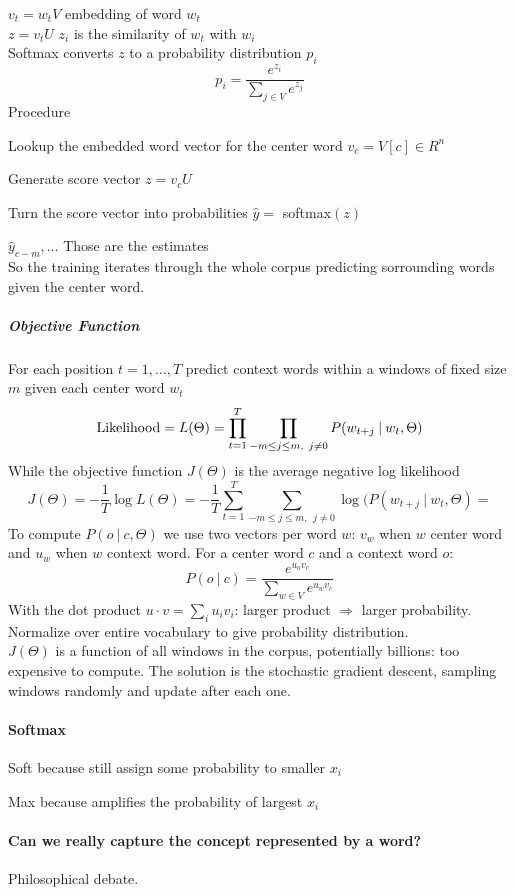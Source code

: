 \documentclass[10pt]{report}
\begin{document}
$v_t = w_tV$ embedding of word $w_t$\\$z=v_tU$ $z_i$ is the similarity of $w_t$ with $w_i$\\Softmax converts $z$ to a probability distribution $p_i$ $$p_i=\frac{e^{z_i}}{\sum_{j\in V}e^{z_j}}$$
Procedure
\begin{list}{}{}
	\item Lookup the embedded word vector for the center word $v_c = V[c] \in R^n$
	\item Generate score vector $z = v_cU$
	\item Turn the score vector into probabilities $\hat{y} =$ softmax$(z)$
\end{list}
$\hat{y}_{c-m},\ldots$ Those are the estimates\\ %
So the training iterates through the whole corpus predicting sorrounding words given the center word.
\subparagraph{Objective Function} For each position $t=1,\ldots,T$ predict context words within a windows of fixed size $m$ given each center word $w_t$ $$\hbox{Likelihood} = L(\Theta) = \prod_{t=1}^T\prod_{-m\leq j\leq m,\:\:j\neq 0} P(w_{t+j}\:|\:w_t,\Theta)$$
While the objective function $J(\Theta)$ is the average negative log likelihood $$J(\Theta) = -\frac{1}{T}\log L(\Theta) = -\frac{1}{T}\sum_{t=1}^T\sum_{-m\leq j\leq m,\:\:j\neq 0} \log(P(w_{t+j}\:|\:w_t,\Theta)=$$
To compute $P(o\:|\:c, \Theta)$ we use two vectors per word $w$: $v_w$ when $w$ center word and $u_w$ when $w$ context word. For a center word $c$ and a context word $o$:$$P(o\:|\:c) = \frac{e^{u_o v_c}}{\sum_{w\in V} e^{u_w v_c}}$$
With the dot product $u\cdot v = \sum_i u_iv_i$: larger product $\Rightarrow$ larger probability. Normalize over entire vocabulary to give probability distribution.\\
$J(\Theta)$ is a function of all windows in the corpus, potentially billions: too expensive to compute. The solution is the stochastic gradient descent, sampling windows randomly and update after each one.
\paragraph{Softmax}\begin{list}{}{}
	\item Soft because still assign some probability to smaller $x_i$
	\item Max because amplifies the probability of largest $x_i$
\end{list}
\paragraph{Can we really capture the concept represented by a word?} Philosophical debate.
\end{document}
